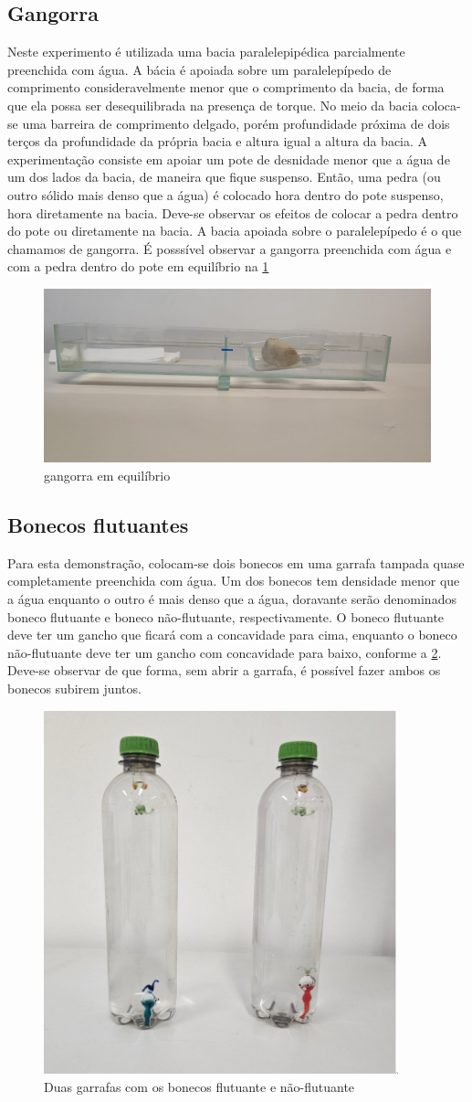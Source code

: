 \subsection{Gangorra}
Neste experimento é utilizada uma bacia paralelepipédica parcialmente preenchida
com água. A bácia é apoiada sobre um paralelepípedo de comprimento
consideravelmente menor que o comprimento da bacia, de forma que ela possa ser
desequilibrada na presença de torque. No meio da bacia coloca-se uma barreira de
comprimento delgado, porém profundidade próxima de dois terços da profundidade
da própria bacia e altura igual a altura da bacia. A experimentação consiste em
apoiar um pote de desnidade menor que a água de um dos lados da bacia, de
maneira que fique suspenso. Então, uma pedra (ou outro sólido mais denso que a
água) é colocado hora dentro do pote suspenso, hora diretamente na bacia.
Deve-se observar os efeitos de colocar a pedra dentro do pote ou diretamente na
bacia. A bacia apoiada sobre o paralelepípedo é o que chamamos de gangorra. É posssível observar 
a gangorra preenchida com água e com a pedra dentro do pote em equilíbrio na \cref{gangorra.png}  
\begin{figure}[H]
    \centering
    \includegraphics[width=.35\linewidth]{fig/gangorra.jpeg}
    \caption{gangorra em equilíbrio}
    \label{gangorra.png}
\end{figure}

\subsection{Bonecos flutuantes}
Para esta demonstração, colocam-se dois bonecos em uma garrafa tampada quase
completamente preenchida com água. Um dos bonecos tem densidade menor que a água
enquanto o outro é mais denso que a água, doravante serão denominados boneco 
flutuante e boneco não-flutuante, respectivamente. O boneco flutuante deve
ter um gancho que ficará com a concavidade para cima, enquanto o boneco não-flutuante
deve ter um gancho com concavidade para baixo, conforme a \cref{bonecos.png}. Deve-se observar de que
forma, sem abrir a garrafa, é possível fazer ambos os bonecos subirem juntos. 
\begin{figure}[H]
    \centering
    \includegraphics[width=.35\linewidth]{fig/bonecos.png}
    \caption{Duas garrafas com os bonecos flutuante e não-flutuante}
    \label{bonecos.png}
\end{figure}

